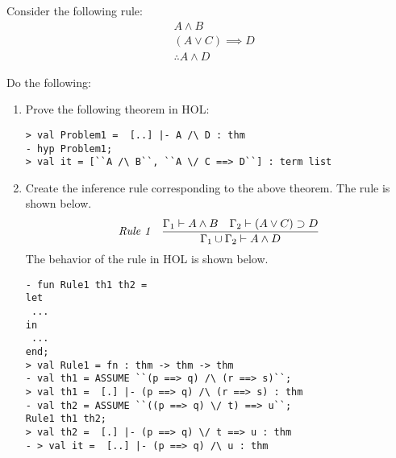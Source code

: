 \begin{exercise}
Consider the following rule:
\begin{align*}
  & A \wedge B\\
  & (A \vee C) \implies D\\
  & \therefore A \wedge D
\end{align*}

Do the following:
\begin{enumerate}[{A.}]
\item Prove the following theorem in HOL:
  \begin{small}
\begin{verbatim}
> val Problem1 =  [..] |- A /\ D : thm
- hyp Problem1;
> val it = [``A /\ B``, ``A \/ C ==> D``] : term list
\end{verbatim}
  \end{small}
\item Create the inference rule corresponding to the above
  theorem. The rule is shown below.
  \begin{gather*}
    \irule
    {\seqs{\Gamma_1}{A \wedge B} \quad \seqs{\Gamma_2}{(A \vee C) \implies D}}
    {\seqs{\Gamma_1 \cup \Gamma_2}{A \wedge D}}
    {Rule 1}
  \end{gather*}
The behavior of the rule in HOL is shown below.
\begin{small}
\begin{verbatim}
- fun Rule1 th1 th2 =
let
 ...
in
 ...
end;
> val Rule1 = fn : thm -> thm -> thm
- val th1 = ASSUME ``(p ==> q) /\ (r ==> s)``;
> val th1 =  [.] |- (p ==> q) /\ (r ==> s) : thm
- val th2 = ASSUME ``((p ==> q) \/ t) ==> u``;
Rule1 th1 th2;
> val th2 =  [.] |- (p ==> q) \/ t ==> u : thm
- > val it =  [..] |- (p ==> q) /\ u : thm
\end{verbatim}
\end{small}

\end{enumerate}
  
\end{exercise}

